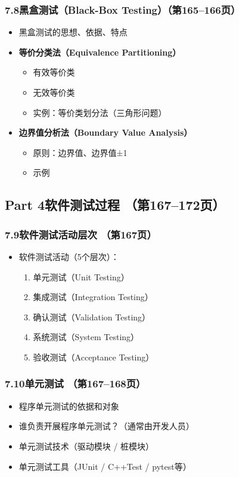 \documentclass[12pt,a4paper]{ctexart}
\begin{document}
\subsubsection{7.8\quad 黑盒测试（Black-Box Testing）\hfill（第165--166页）}
\begin{itemize}
    \item 黑盒测试的思想、依据、特点
    \item \textbf{等价分类法（Equivalence Partitioning）}
    \begin{itemize}
        \item 有效等价类
        \item 无效等价类
        \item 实例：等价类划分法（三角形问题）
    \end{itemize}
    \item \textbf{边界值分析法（Boundary Value Analysis）}
    \begin{itemize}
        \item 原则：边界值、边界值±1
        \item 示例
    \end{itemize}
\end{itemize}

\subsection{Part 4\quad 软件测试过程 \hfill（第167--172页）}

\subsubsection{7.9\quad 软件测试活动层次 \hfill（第167页）}
\begin{itemize}
    \item 软件测试活动（5个层次）：
    \begin{enumerate}
        \item 单元测试（Unit Testing）
        \item 集成测试（Integration Testing）
        \item 确认测试（Validation Testing）
        \item 系统测试（System Testing）
        \item 验收测试（Acceptance Testing）
    \end{enumerate}
\end{itemize}

\subsubsection{7.10\quad 单元测试 \hfill（第167--168页）}
\begin{itemize}
    \item 程序单元测试的依据和对象
    \item 谁负责开展程序单元测试？（通常由开发人员）
    \item 单元测试技术（驱动模块 / 桩模块）
    \item 单元测试工具（JUnit / C++Test / pytest等）
\end{itemize}
\end{document}

